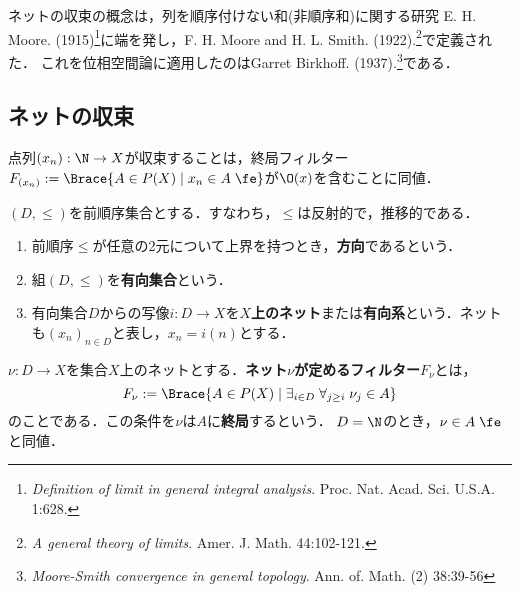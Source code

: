 \documentclass[uplatex,dvipdfmx]{jsreport}
\begin{document}
\begin{history}
    ネットの収束の概念は，列を順序付けない和(非順序和)に関する研究
    E. H. Moore. (1915)\footnote{\textit{Definition of limit in general integral analysis}. Proc. Nat. Acad. Sci. U.S.A. 1:628.}に端を発し，F. H. Moore and H. L. Smith. (1922).\footnote{\textit{A general theory of limits}. Amer. J. Math. 44:102-121.}で定義された．
    これを位相空間論に適用したのはGarret Birkhoff. (1937).\footnote{\textit{Moore-Smith convergence in general topology}. Ann. of. Math. (2) 38:39-56}である．
\end{history}

\subsection{ネットの収束}

\begin{tcolorbox}[colframe=ForestGreen, colback=ForestGreen!10!white,breakable,colbacktitle=ForestGreen!40!white,coltitle=black,fonttitle=\bfseries\sffamily,
title=]
    点列$(x_n):\N\to X$が収束することは，終局フィルター$F_{(x_n)}:=\Brace{A\in P(X)\mid x_n\in A\;\fe}$が$\O(x)$を含むことに同値．
\end{tcolorbox}

\begin{definition}
    $(D,\le)$を前順序集合とする．すなわち，$\le$は反射的で，推移的である．
    \begin{enumerate}
        \item 前順序$\le$が任意の2元について上界を持つとき，\textbf{方向}であるという．
        \item 組$(D,\le)$を\textbf{有向集合}という．
        \item 有向集合$D$からの写像$i:D\to X$を\textbf{$X$上のネット}または\textbf{有向系}という．ネットも$(x_n)_{n\in D}$と表し，$x_n=i(n)$とする．
    \end{enumerate}
\end{definition}

\begin{definition}
        $\nu:D\to X$を集合$X$上のネットとする．\textbf{ネット$\nu$が定めるフィルター}$F_\nu$とは，
        \[F_\nu:=\Brace{A\in P(X)\mid \exists_{i\in D}\;\forall_{j\ge i}\;\nu_j\in A}\]
        のことである．この条件を$\nu$は$A$に\textbf{終局}するという．
        $D=\N$のとき，$\nu\in A\;\fe$と同値．
\end{definition}
\end{document}
